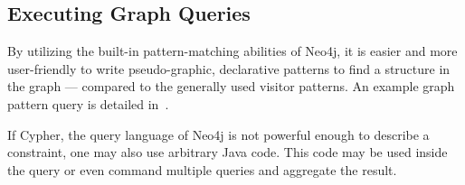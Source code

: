 \subsection{Executing Graph Queries}
By utilizing the built-in pattern-matching abilities of Neo4j, it is easier and more user-friendly to write pseudo-graphic, declarative patterns to find a structure in the graph --- compared to the generally used visitor patterns. An example graph pattern query is detailed in~.

If Cypher, the query language of Neo4j is not powerful enough to describe a constraint, one may also use arbitrary Java code. This code may be used inside the query or even command multiple queries and aggregate the result.
